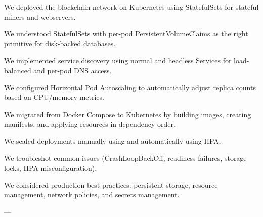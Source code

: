 \begin{chaptersummary}
\item We deployed the blockchain network on Kubernetes using StatefulSets for stateful miners and webservers.
\item We understood StatefulSets with per-pod PersistentVolumeClaims as the right primitive for disk-backed databases.
\item We implemented service discovery using normal and headless Services for load-balanced and per-pod DNS access.
\item We configured Horizontal Pod Autoscaling to automatically adjust replica counts based on CPU/memory metrics.
\item We migrated from Docker Compose to Kubernetes by building images, creating manifests, and applying resources in dependency order.
\item We scaled deployments manually using  and automatically using HPA.
\item We troubleshot common issues (CrashLoopBackOff, readiness failures, storage locks, HPA misconfiguration).
\item We considered production best practices: persistent storage, resource management, network policies, and secrets management.
\end{chaptersummary}

---


